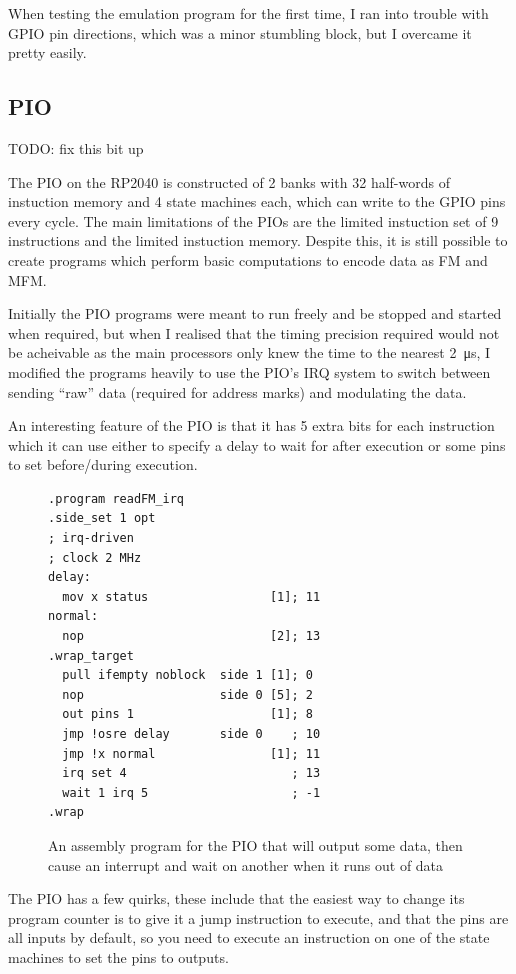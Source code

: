 \documentclass[a4paper]{article}
\begin{document}
When testing the emulation program for the first time, I ran into
trouble with GPIO pin directions, which was a minor stumbling block,
but I overcame it pretty easily.

\subsection{PIO}

TODO: fix this bit up

The PIO on the RP2040 is constructed of 2 banks with 32 half-words of
instuction memory and 4 state machines each, which can write to the
GPIO pins every cycle. The main limitations of the PIOs are the
limited instuction set of 9 instructions and the limited instuction
memory. Despite this, it is still possible to create programs which
perform basic computations to encode data as FM and MFM.

Initially the PIO programs were meant to run freely and be stopped and
started when required, but when I realised that the timing precision
required would not be acheivable as the main processors only knew the
time to the nearest \qty{2}{\us}, I modified the programs heavily to
use the PIO's IRQ system to switch between sending ``raw'' data
(required for address marks) and modulating the data.

An interesting feature of the PIO is that it has 5 extra bits for
each instruction which it can use either to specify a delay to wait
for after execution or some pins to set before/during execution.

\begin{figure}
\begin{verbatim}
.program readFM_irq
.side_set 1 opt
; irq-driven
; clock 2 MHz
delay:
  mov x status                 [1]; 11
normal:
  nop                          [2]; 13 
.wrap_target
  pull ifempty noblock  side 1 [1]; 0
  nop                   side 0 [5]; 2
  out pins 1                   [1]; 8
  jmp !osre delay       side 0    ; 10
  jmp !x normal                [1]; 11
  irq set 4                       ; 13
  wait 1 irq 5                    ; -1
.wrap
\end{verbatim}
  \caption{An assembly program for the PIO that will output some data,
    then cause an interrupt and wait on another when it runs out of data}
\end{figure}

The PIO has a few quirks, these include that the easiest way to change
its program counter is to give it a jump instruction to execute, and
that the pins are all inputs by default, so you need to execute an
instruction on one of the state machines to set the pins to outputs.
\end{document}
